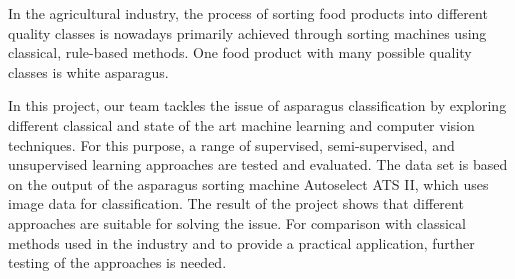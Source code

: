 In the agricultural industry, the process of sorting food products into different quality classes is nowadays primarily achieved through sorting machines using classical, rule-based methods. One food product with many possible quality classes is white asparagus.

In this project, our team tackles the issue of asparagus classification by exploring different classical and state of the art machine learning and computer vision techniques. For this purpose, a range of supervised, semi-supervised, and unsupervised learning approaches are tested and evaluated. The data set is based on the output of the asparagus sorting machine Autoselect ATS II, which uses image data for classification. The result of the project shows that different approaches are suitable for solving the issue. For comparison with classical methods used in the industry and to provide a practical application, further testing of the approaches is needed.
